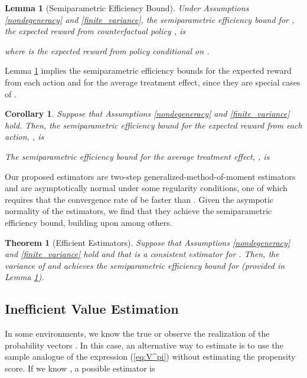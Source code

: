 \documentclass[letterpaper]{article} \usepackage{aaai19}  \usepackage{times}  \usepackage{helvet}  \usepackage{courier}  \usepackage{url}  \usepackage{graphicx}  \frenchspacing  \usepackage{comment}
\newtheorem{theorem}{Theorem}
\newtheorem{corollary}{Corollary}
\newtheorem{lemma}{Lemma}
\newcommand{\citet}[1]
{\citeauthor{#1} \shortcite{#1}}
\begin{document}
\begin{lemma}[Semiparametric Efficiency Bound]\label{prop:bound:stationary}
	Under Assumptions \ref{nondegeneracy} and \ref{finite_variance}, the semiparametric efficiency bound for , the expected reward from counterfactual policy , is
	
	where  is the expected reward from policy  conditional on .
\end{lemma}

Lemma \ref{prop:bound:stationary} implies the semiparametric efficiency bounds for the expected reward from each action and for the average treatment effect, since they are special cases of .

\begin{corollary}\label{corollary:bound:action}
	Suppose that Assumptions \ref{nondegeneracy} and \ref{finite_variance} hold.
	Then, the semiparametric efficiency bound for the expected reward from each action, , is
	
	The semiparametric efficiency bound for the average treatment effect, , is
	
\end{corollary}

Our proposed estimators are two-step generalized-method-of-moment estimators and are asymptotically normal under some regularity conditions, one of which requires that the convergence rate of  be faster than  \cite{Newey1994,chen2007large}.
Given the asympotic normality of the estimators, we find that they achieve the semiparametric efficiency bound, building upon \citet{Ackerberg2014} among others.

\begin{theorem}[Efficient Estimators]\label{prop:estimator:stationary}
	Suppose that Assumptions \ref{nondegeneracy} and \ref{finite_variance} hold and that  is a consistent estimator for .
	Then, the variance of  and  achieves the semiparametric efficiency bound for  (provided in Lemma \ref{prop:bound:stationary}).
\end{theorem}



\subsection{Inefficient Value Estimation}

In some environments, we know the true  or observe the realization of the probability vectors .
In this case, an alternative way to estimate  is to use the sample analogue of the expression (\ref{eq:V^pi}) without estimating the propensity score. 
If we know , a possible estimator is
\end{document}

